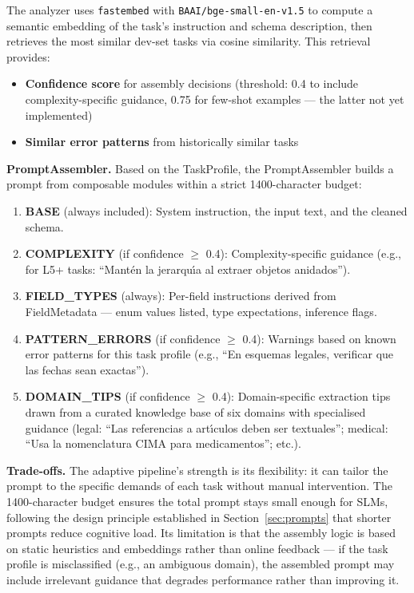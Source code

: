 \documentclass{ceurart}
\begin{document}
The analyzer uses \texttt{fastembed} with \texttt{BAAI/bge-small-en-v1.5} to compute a
semantic embedding of the task's instruction and schema description, then retrieves the
most similar dev-set tasks via cosine similarity.
This retrieval provides:

\begin{itemize}
\item \textbf{Confidence score} for assembly decisions (threshold: 0.4 to include
  complexity-specific guidance, 0.75 for few-shot examples --- the latter not yet
  implemented)
\item \textbf{Similar error patterns} from historically similar tasks
\end{itemize}

\textbf{PromptAssembler.}
Based on the TaskProfile, the PromptAssembler builds a prompt from composable modules
within a strict 1400-character budget:

\begin{enumerate}
\item \textbf{BASE} (always included): System instruction, the input text, and the
  cleaned schema.
\item \textbf{COMPLEXITY} (if confidence $\geq$ 0.4): Complexity-specific guidance
  (e.g., for L5+ tasks: ``Mant\'{e}n la jerarqu\'{\i}a al extraer objetos anidados'').
\item \textbf{FIELD\_TYPES} (always): Per-field instructions derived from
  FieldMetadata --- enum values listed, type expectations, inference flags.
\item \textbf{PATTERN\_ERRORS} (if confidence $\geq$ 0.4): Warnings based on known
  error patterns for this task profile (e.g., ``En esquemas legales, verificar que las
  fechas sean exactas'').
\item \textbf{DOMAIN\_TIPS} (if confidence $\geq$ 0.4): Domain-specific extraction
  tips drawn from a curated knowledge base of six domains with specialised guidance
  (legal: ``Las referencias a art\'{\i}culos deben ser textuales''; medical:
  ``Usa la nomenclatura CIMA para medicamentos''; etc.).
\end{enumerate}

\textbf{Trade-offs.}
The adaptive pipeline's strength is its flexibility: it can tailor the prompt to the
specific demands of each task without manual intervention.
The 1400-character budget ensures the total prompt stays small enough for SLMs,
following the design principle established in Section~\ref{sec:prompts} that shorter
prompts reduce cognitive load.
Its limitation is that the assembly logic is based on static heuristics and embeddings
rather than online feedback --- if the task profile is misclassified (e.g., an
ambiguous domain), the assembled prompt may include irrelevant guidance that degrades
performance rather than improving it.
\end{document}
